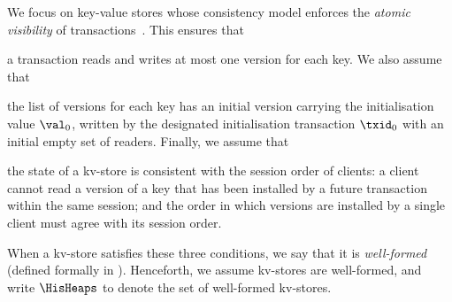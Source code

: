 We focus on key-value stores whose consistency model enforces the \emph{atomic visibility} of transactions~\cite{framework-concur}. 
This ensures that 
\begin{enumerate*}
	\item a transaction reads and writes at most one version for each key.
We also assume that 
	\item the list of versions for each key has an initial version 
carrying the initialisation value $\val_0$,  written by the designated initialisation transaction $\txid_0$ 
with an initial empty set of readers.
Finally, we assume that 
	\item the state of a kv-store is consistent with 
the session order of clients: a client cannot read a version of a key that has 
been installed by a future transaction within the same session;  and 
the order in which versions are installed by a single client must agree 
with its session order. 
\end{enumerate*}
When a kv-store satisfies these three conditions, we say that it is \emph{well-formed} (defined formally in \todo). 
Henceforth, we assume kv-stores are well-formed, and write  $\HisHeaps$ to denote 
the set of well-formed kv-stores.

